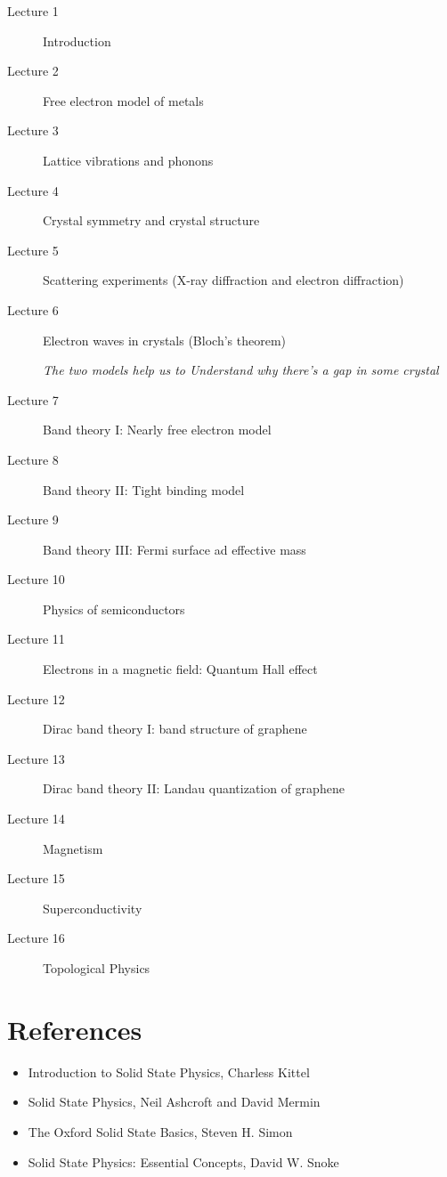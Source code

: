 \begin{description}
  \item [Lecture 1] Introduction
  \item [Lecture 2] Free electron model of metals
  \item [Lecture 3] Lattice vibrations and phonons
  \item [Lecture 4] Crystal symmetry and crystal structure
  \item [Lecture 5] Scattering experiments (X-ray diffraction and electron diffraction)
  \item [Lecture 6] Electron waves in crystals (Bloch's theorem)
  
  \emph{The two models help us to Understand why there's a gap in some crystal}
  \item [Lecture 7] Band theory I: Nearly free electron model
  \item [Lecture 8] Band theory II: Tight binding model
  \item [Lecture 9] Band theory III: Fermi surface ad effective mass
  \item [Lecture 10] Physics of semiconductors
  \item [Lecture 11] Electrons in a magnetic field: Quantum Hall effect
  \item [Lecture 12] Dirac band theory I: band structure of graphene
  \item [Lecture 13] Dirac band theory II: Landau quantization of graphene
  \item [Lecture 14] Magnetism
  \item [Lecture 15] Superconductivity
  \item [Lecture 16] Topological Physics
\end{description}

\section{References}

\begin{itemize}
  \item Introduction to Solid State Physics, Charless Kittel
  \item Solid State Physics, Neil Ashcroft and David Mermin
  \item The Oxford Solid State Basics, Steven H. Simon
  \item Solid State Physics: Essential Concepts, David W. Snoke
\end{itemize}